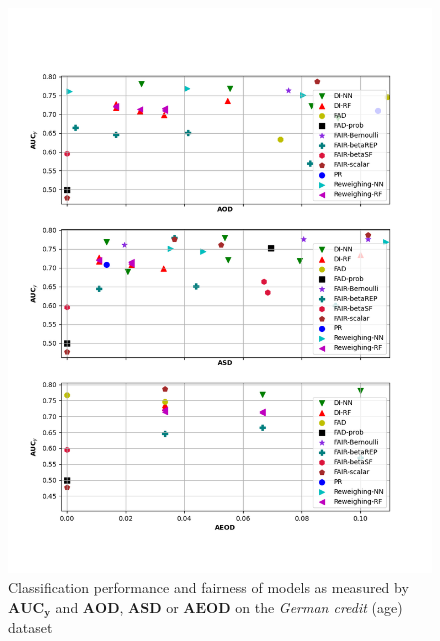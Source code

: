 \documentclass[preprint,12pt]{elsarticle}
\begin{document}
\begin{figure}
	\center
	\includegraphics[angle=0, width=1\textwidth]{Ger_age_all.png}
	\captionsetup{justification=centering}
	\caption{Classification performance and fairness of models as measured by $\mathbf{AUC_y}$ and $\mathbf{AOD}$, $\mathbf{ASD}$ or $\mathbf{AEOD}$ on the \textit{German credit} (age) dataset}
	\label{fig:Ger_age all}
	\vskip -0.2in
\end{figure}
\end{document}
